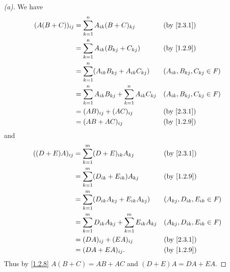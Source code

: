 \begin{proof}[(a)]
  We have
  \begin{align*}
    (A (B + C))_{i j} & = \sum_{k = 1}^n A_{i k} (B + C)_{k j}                            &  & \text{(by \cref{2.3.1})}           \\
                      & = \sum_{k = 1}^n A_{i k} (B_{k j} + C_{k j})                      &  & \text{(by \cref{1.2.9})}           \\
                      & = \sum_{k = 1}^n (A_{i k} B_{k j} + A_{i k} C_{k j})              &  & (A_{i k}, B_{k j}, C_{k j} \in \F) \\
                      & = \sum_{k = 1}^n A_{i k} B_{k j} + \sum_{k = 1}^n A_{i k} C_{k j} &  & (A_{i k}, B_{k j}, C_{k j} \in \F) \\
                      & = (AB)_{i j} + (AC)_{i j}                                         &  & \text{(by \cref{2.3.1})}           \\
                      & = (AB + AC)_{i j}                                                 &  & \text{(by \cref{1.2.9})}
  \end{align*}
  and
  \begin{align*}
    ((D + E) A)_{i j} & = \sum_{k = 1}^m (D + E)_{i k} A_{k j}                            &  & \text{(by \cref{2.3.1})}           \\
                      & = \sum_{k = 1}^m (D_{i k} + E_{i k}) A_{k j}                      &  & \text{(by \cref{1.2.9})}           \\
                      & = \sum_{k = 1}^m (D_{i k} A_{k j} + E_{i k} A_{k j})              &  & (A_{k j}, D_{i k}, E_{i k} \in \F) \\
                      & = \sum_{k = 1}^m D_{i k} A_{k j} + \sum_{k = 1}^m E_{i k} A_{k j} &  & (A_{k j}, D_{i k}, E_{i k} \in \F) \\
                      & = (DA)_{i j} + (EA)_{i j}                                         &  & \text{(by \cref{2.3.1})}           \\
                      & = (DA + EA)_{i j}.                                                &  & \text{(by \cref{1.2.9})}
  \end{align*}
  Thus by \cref{1.2.8} \(A (B + C) = AB + AC\) and \((D + E) A = DA + EA\).
\end{proof}

